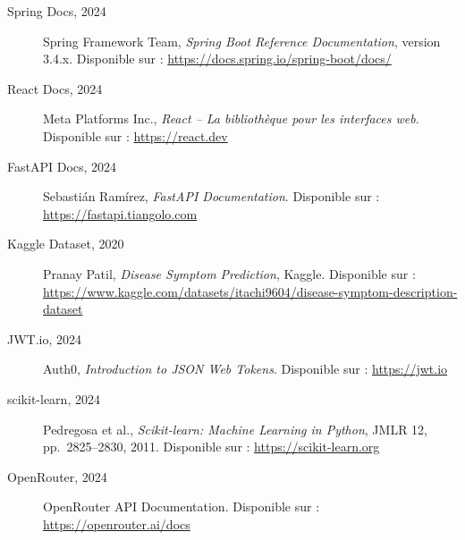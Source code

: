 \documentclass[12pt,a4paper]{report}
\begin{document}
\begin{description}
    \item[Spring Docs, 2024] Spring Framework Team,
    \textit{Spring Boot Reference Documentation}, version 3.4.x.
    Disponible sur : \url{https://docs.spring.io/spring-boot/docs/}

    \item[React Docs, 2024] Meta Platforms Inc.,
    \textit{React -- La bibliothèque pour les interfaces web}.
    Disponible sur : \url{https://react.dev}

    \item[FastAPI Docs, 2024] Sebastián Ramírez,
    \textit{FastAPI Documentation}.
    Disponible sur : \url{https://fastapi.tiangolo.com}

    \item[Kaggle Dataset, 2020] Pranay Patil,
    \textit{Disease Symptom Prediction}, Kaggle.
    Disponible sur :
    \url{https://www.kaggle.com/datasets/itachi9604/disease-symptom-description-dataset}

    \item[JWT.io, 2024] Auth0, \textit{Introduction to JSON Web Tokens}.
    Disponible sur : \url{https://jwt.io}

    \item[scikit-learn, 2024] Pedregosa et al., \textit{Scikit-learn: Machine Learning
    in Python}, JMLR 12, pp.~2825--2830, 2011.
    Disponible sur : \url{https://scikit-learn.org}

    \item[OpenRouter, 2024] OpenRouter API Documentation.
    Disponible sur : \url{https://openrouter.ai/docs}
\end{description}
\end{document}
